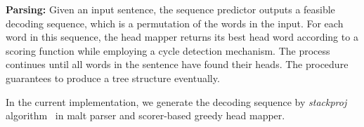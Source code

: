 {\bf Parsing:} Given an input sentence, the sequence predictor
outputs a feasible decoding sequence, which is a permutation of
the words in the input. For each word in this sequence,
the head mapper returns its best head word according to a scoring function
while employing a cycle detection mechanism.
The process continues until all words in the sentence have found their
heads.
The procedure guarantees to produce a tree structure eventually.

In the current implementation, we generate the decoding sequence by
{\em stackproj} algorithm~\cite{nivre2009non} in
malt parser and scorer-based greedy head mapper.

